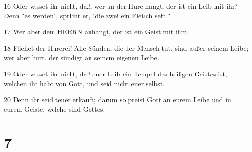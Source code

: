 \par 16 Oder wisset ihr nicht, daß, wer an der Hure hangt, der ist ein Leib mit ihr? Denn "es werden", spricht er, "die zwei ein Fleisch sein."
\par 17 Wer aber dem HERRN anhangt, der ist ein Geist mit ihm.
\par 18 Fliehet der Hurerei! Alle Sünden, die der Mensch tut, sind außer seinem Leibe; wer aber hurt, der sündigt an seinem eigenen Leibe.
\par 19 Oder wisset ihr nicht, daß euer Leib ein Tempel des heiligen Geistes ist, welchen ihr habt von Gott, und seid nicht euer selbst.
\par 20 Denn ihr seid teuer erkauft; darum so preist Gott an eurem Leibe und in eurem Geiste, welche sind Gottes.

\chapter{7}


